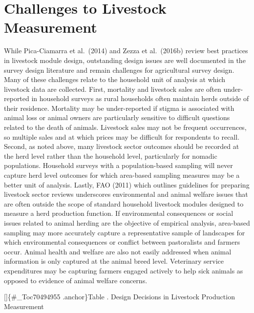 \documentclass[
]{book}
\begin{document}
\hypertarget{challenges-to-livestock-measurement}{%
\section{Challenges to Livestock Measurement}\label{challenges-to-livestock-measurement}}

While Pica-Ciamarra et al.~(2014) and Zezza et al.~(2016b) review best practices in livestock module design, outstanding design issues are well documented in the survey design literature and remain challenges for agricultural survey design. Many of these challenges relate to the household unit of analysis at which livestock data are collected. First, mortality and livestock sales are often under-reported in household surveys as rural households often maintain herds outside of their residence. Mortality may be under-reported if stigma is associated with animal loss or animal owners are particularly sensitive to difficult questions related to the death of animals. Livestock sales may not be frequent occurrences, so multiple sales and at which prices may be difficult for respondents to recall. Second, as noted above, many livestock sector outcomes should be recorded at the herd level rather than the household level, particularly for nomadic populations. Household surveys with a population-based sampling will never capture herd level outcomes for which area-based sampling measures may be a better unit of analysis. Lastly, FAO (2011) which outlines guidelines for preparing livestock sector reviews underscores environmental and animal welfare issues that are often outside the scope of standard household livestock modules designed to measure a herd production function. If environmental consequences or social issues related to animal herding are the objective of empirical analysis, area-based sampling may more accurately capture a representative sample of landscapes for which environmental consequences or conflict between pastoralists and farmers occur. Animal health and welfare are also not easily addressed when animal information is only captured at the animal breed level. Veterinary service expenditures may be capturing farmers engaged actively to help sick animals as opposed to evidence of animal welfare concerns.

{[}{]}\{\#\_Toc70494955 .anchor\}Table . Design Decisions in Livestock Production Measurement
\end{document}
